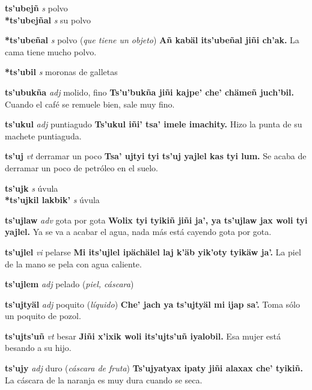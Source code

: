 \documentclass[10pt]{scrbook}
\newcommand{\entry}[1]{\textbf{#1}}
\newcommand{\partofspeech}[1]{\textit{#1}}
\newcommand{\spanishtranslation}[1]{#1}
\newcommand{\clarification}[1]{(\textit{#1})}
\newcommand{\cholexample}[1]{\textbf{#1}}
\newcommand{\exampletranslation}[1]{#1}
\newcommand{\secondaryentry}[1]{\\\textbf{#1}}
\newcommand{\secondpartofspeech}[1]{\textit{#1}}
\newcommand{\secondtranslation}[1]{#1}
\begin{document}
\begin{multicols}{2}
\entry{ts'ubejñ}
\partofspeech{s}
\spanishtranslation{polvo}
\secondaryentry{*ts'ubejñal}
\secondpartofspeech{s}
\secondtranslation{su polvo}

\entry{*ts'ubeñal}
\partofspeech{s}
\spanishtranslation{polvo}
\clarification{que tiene un objeto}
\cholexample{Añ kabäl its'ubeñal jiñi ch'ak.}
\exampletranslation{La cama tiene mucho polvo.}

\entry{*ts'ubil}
\partofspeech{s}
\spanishtranslation{moronas de galletas}

\entry{ts'ubukña}
\partofspeech{adj}
\spanishtranslation{molido, fino}
\cholexample{Ts'u'bukña jiñi kajpe' che' chämeñ juch'bil.}
\exampletranslation{Cuando el café se remuele bien, sale muy fino.}

\entry{ts'ukul}
\partofspeech{adj}
\spanishtranslation{puntiagudo}
\cholexample{Ts'ukul iñi' tsa' imele imachity.}
\exampletranslation{Hizo la punta de su machete puntiaguda.}

\entry{ts'uj}
\partofspeech{vt}
\spanishtranslation{derramar un poco}
\cholexample{Tsa' ujtyi tyi ts'uj yajlel kas tyi lum.}
\exampletranslation{Se acaba de derramar un poco de petróleo en el suelo.}

\entry{ts'ujk}
\partofspeech{s}
\spanishtranslation{úvula}
\secondaryentry{*ts'ujkil lakbik'}
\secondpartofspeech{s}
\secondtranslation{úvula}

\entry{ts'ujlaw}
\partofspeech{adv}
\spanishtranslation{gota por gota}
\cholexample{Wolix tyi tyikiñ jiñi ja', ya ts'ujlaw jax woli tyi yajlel.}
\exampletranslation{Ya se va a acabar el agua, nada más está cayendo gota por gota.}

\entry{ts'ujlel}
\partofspeech{vi}
\spanishtranslation{pelarse}
\cholexample{Mi its'ujlel ipächälel laj k'äb yik'oty tyikäw ja'.}
\exampletranslation{La piel de la mano se pela con agua caliente.}

\entry{ts'ujlem}
\partofspeech{adj}
\spanishtranslation{pelado}
\clarification{piel, cáscara}

\entry{ts'ujtyäl}
\partofspeech{adj}
\spanishtranslation{poquito}
\clarification{líquido}
\cholexample{Che' jach ya ts'ujtyäl mi ijap sa'.}
\exampletranslation{Toma sólo un poquito de pozol.}

\entry{ts'ujts'uñ}
\partofspeech{vt}
\spanishtranslation{besar}
\cholexample{Jiñi x'ixik woli its'ujts'uñ iyalobil.}
\exampletranslation{Esa mujer está besando a su hijo.}

\entry{ts'ujy}
\partofspeech{adj}
\spanishtranslation{duro}
\clarification{cáscara de fruta}
\cholexample{Ts'ujyatyax ipaty jiñi alaxax che' tyikiñ.}
\exampletranslation{La cáscara de la naranja es muy dura cuando se seca.}


\end{multicols}
\end{document}
